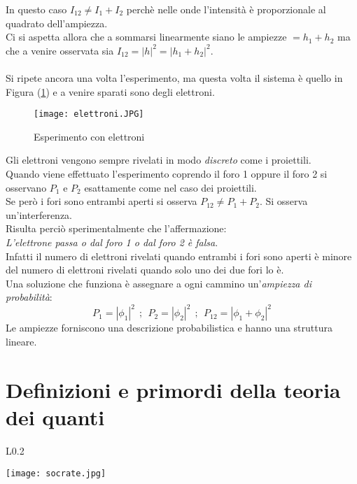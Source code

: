\documentclass[twoside]{article}
\begin{document}
In questo caso $I_{12} \ne I_1 + I_2$ perchè nelle onde l'intensità è proporzionale al quadrato dell'ampiezza.
\\
Ci si aspetta allora che a sommarsi linearmente siano le ampiezze $=h_1 +h_2$ ma che a venire osservata sia $I_{12}=|h|^2=|h_1 +h_2|^2$.
\\
\\
Si ripete ancora una volta l'esperimento, ma questa volta il sistema è quello in Figura (\ref{elettroni}) e a venire sparati sono degli elettroni.

\begin{figure}[ht]
\centering
\texttt{[image: elettroni.JPG]}
\caption{Esperimento con elettroni}
\label{elettroni}
\end{figure}

Gli elettroni vengono sempre rivelati in modo \textit{discreto} come i proiettili.
\\
Quando viene effettuato l'esperimento coprendo il foro 1 oppure il foro 2 si osservano $P_1$ e $P_2$ esattamente come nel caso dei proiettili.
\\
Se però i fori sono entrambi aperti si osserva $P_{12} \ne P_1 +P_2$. Si osserva un'interferenza.
\\
Risulta perciò sperimentalmente che l'affermazione:
\\
\textit{L'elettrone passa o dal foro 1 o dal foro 2 è falsa}.
\\
Infatti il numero di elettroni rivelati quando entrambi i fori sono aperti è minore del numero di elettroni rivelati quando solo uno dei due fori lo è.
\\
Una soluzione che funziona è assegnare a ogni cammino un'\textit{ampiezza di probabilità}:
\begin{equation}
    P_1=|\phi_1|^2 \ \ ; \ \ P_2=|\phi_2|^2 \ \ ; \ \ P_{12}=|\phi_1 + \phi_2|^2
\end{equation}
Le ampiezze forniscono una descrizione probabilistica e hanno una struttura lineare.


\newpage

\section{Definizioni e primordi della teoria dei quanti}

\begin{wrapfigure}[4]{L}{0.2\textwidth}
  \begin{center}
    \texttt{[image: socrate.jpg]}
  \end{center}
\end{wrapfigure}\leavevmode
\end{document}
